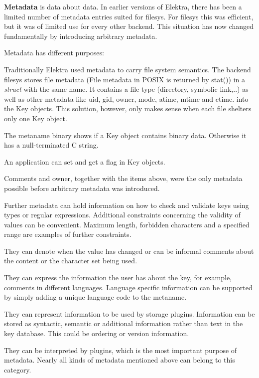 {\bfseries{Metadata}} is data about data. In earlier versions of Elektra, there has been a limited number of metadata entries suited for {\ttfamily filesys}. For {\ttfamily filesys} this was efficient, but it was of limited use for every other backend. This situation has now changed fundamentally by introducing arbitrary metadata.

Metadata has different purposes\+:


\begin{DoxyItemize}
\item Traditionally Elektra used metadata to carry file system semantics. The backend {\ttfamily filesys} stores file metadata (File metadata in P\+O\+S\+IX is returned by {\ttfamily stat()}) in a {\itshape struct} with the same name. It contains a file type (directory, symbolic link,..) as well as other metadata like uid, gid, owner, mode, atime, mtime and ctime. into the {\ttfamily Key} objects. This solution, however, only makes sense when each file shelters only one {\ttfamily Key} object.
\item The metaname {\ttfamily binary} shows if a {\ttfamily Key} object contains binary data. Otherwise it has a null-\/terminated C string.
\item An application can set and get a flag in {\ttfamily Key} objects.
\item Comments and owner, together with the items above, were the only metadata possible before arbitrary metadata was introduced.
\item Further metadata can hold information on how to check and validate keys using types or regular expressions. Additional constraints concerning the validity of values can be convenient. Maximum length, forbidden characters and a specified range are examples of further constraints.
\item They can denote when the value has changed or can be informal comments about the content or the character set being used.
\item They can express the information the user has about the key, for example, comments in different languages. Language specific information can be supported by simply adding a unique language code to the metaname.
\item They can represent information to be used by storage plugins. Information can be stored as syntactic, semantic or additional information rather than text in the key database. This could be ordering or version information.
\item They can be interpreted by plugins, which is the most important purpose of metadata. Nearly all kinds of metadata mentioned above can belong to this category.

\end{DoxyItemize}
